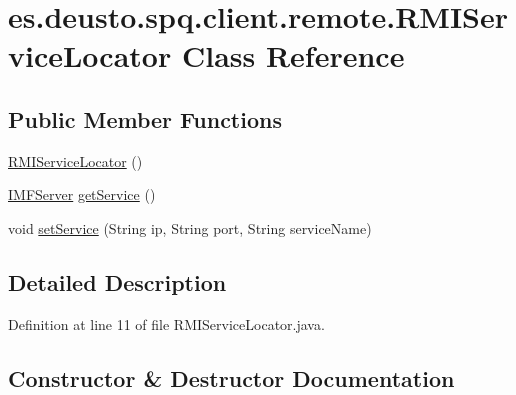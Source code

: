 \hypertarget{classes_1_1deusto_1_1spq_1_1client_1_1remote_1_1_r_m_i_service_locator}{}\section{es.\+deusto.\+spq.\+client.\+remote.\+R\+M\+I\+Service\+Locator Class Reference}
\label{classes_1_1deusto_1_1spq_1_1client_1_1remote_1_1_r_m_i_service_locator}
\subsection*{Public Member Functions}
\begin{DoxyCompactItemize}
\item 
\hyperlink{classes_1_1deusto_1_1spq_1_1client_1_1remote_1_1_r_m_i_service_locator_a642cadb2df18622ca837f541c69213dc}{R\+M\+I\+Service\+Locator} ()
\item 
\hyperlink{interfacees_1_1deusto_1_1spq_1_1server_1_1_i_m_f_server}{I\+M\+F\+Server} \hyperlink{classes_1_1deusto_1_1spq_1_1client_1_1remote_1_1_r_m_i_service_locator_a5994c5077ae236bee7323469a89beebb}{get\+Service} ()
\item 
void \hyperlink{classes_1_1deusto_1_1spq_1_1client_1_1remote_1_1_r_m_i_service_locator_a2625caab4b56417ab4215c5da02e500e}{set\+Service} (String ip, String port, String service\+Name)
\end{DoxyCompactItemize}


\subsection{Detailed Description}


Definition at line 11 of file R\+M\+I\+Service\+Locator.\+java.



\subsection{Constructor \& Destructor Documentation}

